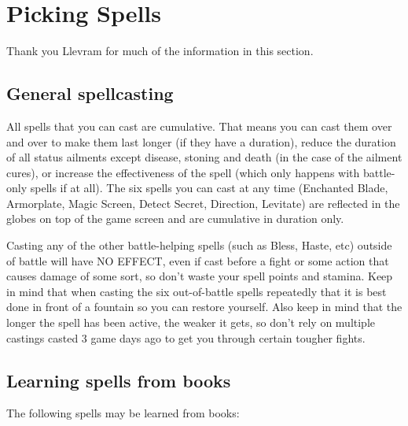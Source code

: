 \documentclass[12pt]{article}
\begin{document}
\section{Picking Spells}\label{picking-spells}

Thank you Llevram for much of the information in this section.

\subsection{General spellcasting}\label{general-spellcasting}

All spells that you can cast are cumulative. That means you can cast
them over and over to make them last longer (if they have a duration),
reduce the duration of all status ailments except disease, stoning and
death (in the case of the ailment cures), or increase the effectiveness
of the spell (which only happens with battle-only spells if at all). The
six spells you can cast at any time (Enchanted Blade, Armorplate, Magic
Screen, Detect Secret, Direction, Levitate) are reflected in the globes
on top of the game screen and are cumulative in duration only.

Casting any of the other battle-helping spells (such as Bless, Haste,
etc) outside of battle will have NO EFFECT, even if cast before a fight
or some action that causes damage of some sort, so don't waste your
spell points and stamina. Keep in mind that when casting the six
out-of-battle spells repeatedly that it is best done in front of a
fountain so you can restore yourself. Also keep in mind that the longer
the spell has been active, the weaker it gets, so don't rely on multiple
castings casted 3 game days ago to get you through certain tougher
fights.

\subsection{Learning spells from
books}\label{learning-spells-from-books}

The following spells may be learned from books:
\end{document}

